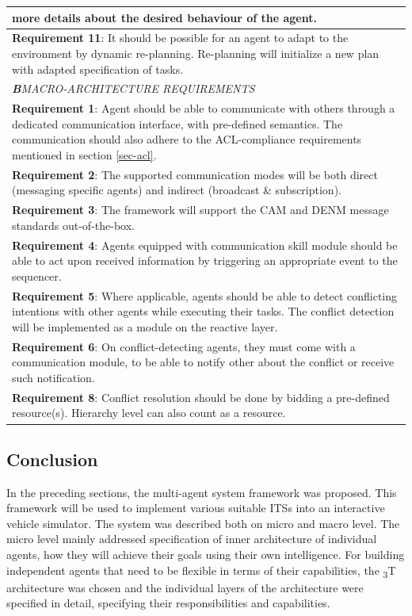 \documentclass[main.tex]{subfiles}
\begin{document}
\begin{table}[htbp]
\begin{tabular}{>{\footnotesize}p{}}
more details about the desired behaviour of the agent.
\\ \midrule 
\textbf{Requirement 11}: It should be possible for an agent to adapt to the environment by dynamic re-planning.
Re-planning will initialize a new plan with adapted specification of tasks.
\\ \midrule
\emph{\textbf{B}\quad MACRO-ARCHITECTURE REQUIREMENTS} \\ \midrule
\textbf{Requirement 1}: Agent should be able to communicate with others through a dedicated communication 
interface, with pre-defined semantics. The communication should also adhere to the ACL-compliance requirements 
mentioned in section \ref{sec-acl}.
\\ \midrule
\textbf{Requirement 2}: The supported communication modes will be both direct (messaging specific agents) and indirect  
(broadcast \& subscription). 
\\ \midrule
\textbf{Requirement 3}: The framework will support the CAM and DENM message standards out-of-the-box.
\\ \midrule
\textbf{Requirement 4}: Agents equipped with communication skill module should be able to act upon received information
by triggering an appropriate event to the sequencer. 
\\ \midrule
\textbf{Requirement 5}: Where applicable, agents should be able to detect conflicting intentions with other agents
while executing their tasks. The conflict detection will be implemented as a module on the reactive layer.
\\ \midrule
\textbf{Requirement 6}: On conflict-detecting agents, they must come with a communication module, to be able to 
notify other about the conflict or receive such notification. 
\\ \midrule
\textbf{Requirement 8}: Conflict resolution should be done by bidding a pre-defined resource(s). Hierarchy level can 
also count as a resource.
\\ \bottomrule
    \end{tabular}
    \label{sys-requirements}
\end{table}
\clearpage

\subsection{Conclusion}

In the preceding sections, the multi-agent system framework was proposed. This framework will be used to implement various 
suitable ITSs into an interactive vehicle simulator. The system was described both on micro and macro level. The micro level 
mainly addressed specification of inner architecture of individual agents, how they will achieve their goals using their 
own intelligence. For building independent agents that need to be flexible in terms of their capabilities, the \textsubscript{3}T
architecture was chosen and the individual layers of the architecture were specified in detail, specifying their responsibilities
and capabilities. 
\end{document}
